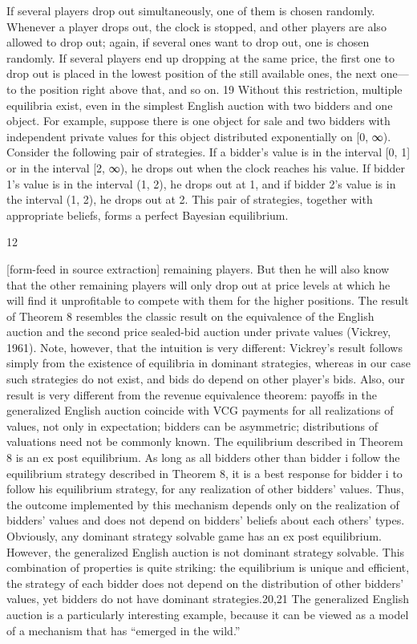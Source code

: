 \documentclass[10pt]{article}
\begin{document}
\begin{ReviewVerbatim}
If several players drop out simultaneously, one of them is chosen randomly. Whenever a player drops out, the
clock is stopped, and other players are also allowed to drop out; again, if several ones want to drop out, one is chosen
randomly. If several players end up dropping at the same price, the first one to drop out is placed in the lowest
position of the still available ones, the next one—to the position right above that, and so on.
19
Without this restriction, multiple equilibria exist, even in the simplest English auction with two bidders and
one object. For example, suppose there is one object for sale and two bidders with independent private values for
this object distributed exponentially on [0, ∞). Consider the following pair of strategies. If a bidder’s value is in
the interval [0, 1] or in the interval [2, ∞), he drops out when the clock reaches his value. If bidder 1’s value is in
the interval (1, 2), he drops out at 1, and if bidder 2’s value is in the interval (1, 2), he drops out at 2. This pair of
strategies, together with appropriate beliefs, forms a perfect Bayesian equilibrium.

12


[form-feed in source extraction]
remaining players. But then he will also know that the other remaining players will only drop out
at price levels at which he will find it unprofitable to compete with them for the higher positions.
The result of Theorem 8 resembles the classic result on the equivalence of the English auction
and the second price sealed-bid auction under private values (Vickrey, 1961). Note, however, that
the intuition is very different: Vickrey’s result follows simply from the existence of equilibria in
dominant strategies, whereas in our case such strategies do not exist, and bids do depend on other
player’s bids. Also, our result is very different from the revenue equivalence theorem: payoffs in the
generalized English auction coincide with VCG payments for all realizations of values, not only in
expectation; bidders can be asymmetric; distributions of valuations need not be commonly known.
The equilibrium described in Theorem 8 is an ex post equilibrium. As long as all bidders other
than bidder i follow the equilibrium strategy described in Theorem 8, it is a best response for bidder
i to follow his equilibrium strategy, for any realization of other bidders’ values. Thus, the outcome
implemented by this mechanism depends only on the realization of bidders’ values and does not
depend on bidders’ beliefs about each others’ types.
Obviously, any dominant strategy solvable game has an ex post equilibrium. However, the
generalized English auction is not dominant strategy solvable. This combination of properties is
quite striking: the equilibrium is unique and efficient, the strategy of each bidder does not depend
on the distribution of other bidders’ values, yet bidders do not have dominant strategies.20,21 The
generalized English auction is a particularly interesting example, because it can be viewed as a
model of a mechanism that has “emerged in the wild.”


\end{ReviewVerbatim}
\end{document}
